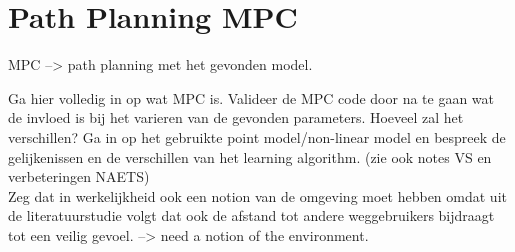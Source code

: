 \chapter{Path Planning MPC}
\label{cha:planning_MPC}

MPC --> path planning met het gevonden model.

Ga hier volledig in op wat MPC is.
Valideer de MPC code door na te gaan wat de invloed is bij het varieren van de gevonden parameters.
Hoeveel zal het verschillen? Ga in op het gebruikte point model/non-linear model en bespreek de gelijkenissen en de verschillen van het learning algorithm. (zie ook notes VS en verbeteringen NAETS)\\

Zeg dat in werkelijkheid ook een notion van de omgeving moet hebben omdat uit de literatuurstudie volgt dat ook de afstand tot andere weggebruikers bijdraagt tot een veilig gevoel. --> need a notion of the environment. 















